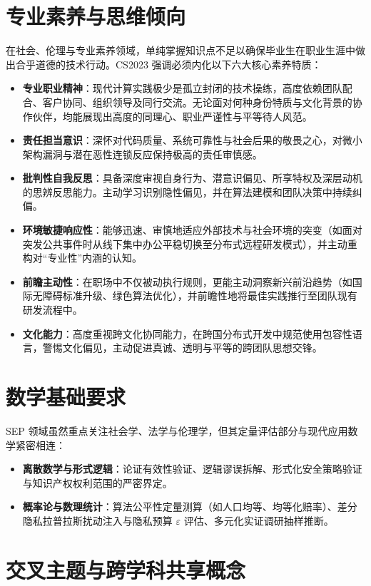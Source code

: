 \section{专业素养与思维倾向}

在社会、伦理与专业素养领域，单纯掌握知识点不足以确保毕业生在职业生涯中做出合乎道德的技术行动。CS2023 强调必须内化以下六大核心素养特质：
\begin{itemize}
    \item \textbf{专业职业精神}：现代计算实践极少是孤立封闭的技术操练，高度依赖团队配合、客户协同、组织领导及同行交流。无论面对何种身份特质与文化背景的协作伙伴，均能展现出高度的同理心、职业严谨性与平等待人风范。
    \item \textbf{责任担当意识}：深怀对代码质量、系统可靠性与社会后果的敬畏之心，对微小架构漏洞与潜在恶性连锁反应保持极高的责任审慎感。
    \item \textbf{批判性自我反思}：具备深度审视自身行为、潜意识偏见、所享特权及深层动机的思辨反思能力。主动学习识别隐性偏见，并在算法建模和团队决策中持续纠偏。
    \item \textbf{环境敏捷响应性}：能够迅速、审慎地适应外部技术与社会环境的突变（如面对突发公共事件时从线下集中办公平稳切换至分布式远程研发模式），并主动重构对“专业性”内涵的认知。
    \item \textbf{前瞻主动性}：在职场中不仅被动执行规则，更能主动洞察新兴前沿趋势（如国际无障碍标准升级、绿色算法优化），并前瞻性地将最佳实践推行至团队现有研发流程中。
    \item \textbf{文化能力}：高度重视跨文化协同能力，在跨国分布式开发中规范使用包容性语言，警惕文化偏见，主动促进真诚、透明与平等的跨团队思想交锋。
\end{itemize}

\section{数学基础要求}

SEP 领域虽然重点关注社会学、法学与伦理学，但其定量评估部分与现代应用数学紧密相连：
\begin{itemize}
    \item \textbf{离散数学与形式逻辑}：论证有效性验证、逻辑谬误拆解、形式化安全策略验证与知识产权权利范围的严密界定。
    \item \textbf{概率论与数理统计}：算法公平性定量测算（如人口均等、均等化赔率）、差分隐私拉普拉斯扰动注入与隐私预算 $\varepsilon$ 评估、多元化实证调研抽样推断。
\end{itemize}

\section{交叉主题与跨学科共享概念}

